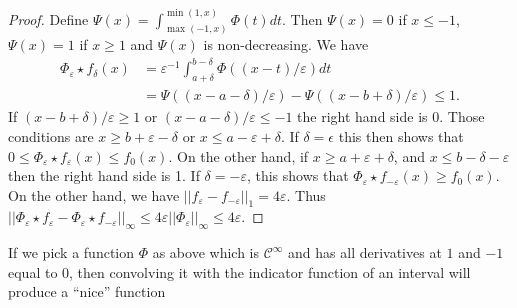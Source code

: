\documentclass{article}
\begin{document}
\begin{proof}
  Define $\Psi(x) = \int_{\max(-1, x)}^{\min(1,x)} \Phi(t) dt$. Then
  $\Psi(x) = 0$ if $x \le -1$, $\Psi(x) = 1$ if $x \ge 1$ and $\Psi(x)$
  is non-decreasing.
  We have
  \begin{displaymath}
    \begin{aligned}
      \Phi_\varepsilon \star f_\delta(x) & = \varepsilon^{-1}\int_{a +
      \delta}^{b - \delta}
      \Phi((x - t)/\varepsilon) dt \\
      & = \Psi((x-a - \delta)/\varepsilon) -
      \Psi((x-b+\delta)/\varepsilon) \le 1.
    \end{aligned}
  \end{displaymath}
If $(x-b + \delta)/\varepsilon \ge 1$ or $(x-a-\delta)/\varepsilon \le
-1$ the right hand side is 0. Those conditions are $x \ge b + \varepsilon
- \delta$ or $x \le a - \varepsilon + \delta$. If $\delta = \epsilon$
this then shows that $0 \le \Phi_\varepsilon \star f_\varepsilon(x) \le f_0(x)$.
On the other hand, if $x \ge a + \varepsilon + \delta$, and $x \le b -
\delta - \varepsilon$ then the right hand side is 1.
If $\delta = - \varepsilon$, this shows that $\Phi_\varepsilon \star
f_{-\varepsilon}(x) \ge f_0(x)$.
On the other hand, we have $||f_\varepsilon - f_{-\varepsilon}||_1 = 4
\varepsilon$. Thus $||\Phi_\varepsilon \star f_\varepsilon - 
\Phi_\varepsilon \star f_{-\varepsilon}||_\infty \le 4 \varepsilon
||\Phi_\varepsilon||_\infty \le 4 \varepsilon$.
\end{proof}
If we pick a function $\Phi$ as above which is $\mathcal{C}^\infty$
and has all derivatives at $1$ and $-1$ equal to 0, then convolving it
with the indicator function of an interval will produce a ``nice''
function 
\nocite{johnson2015saddle}
\nocite{baillie2024summing}
\nocite{schmelzer2008summing}
\nocite{burnol2024moments}
\nocite{maynard2019primes}
\nocite{baillie1979sums}


\end{document}

